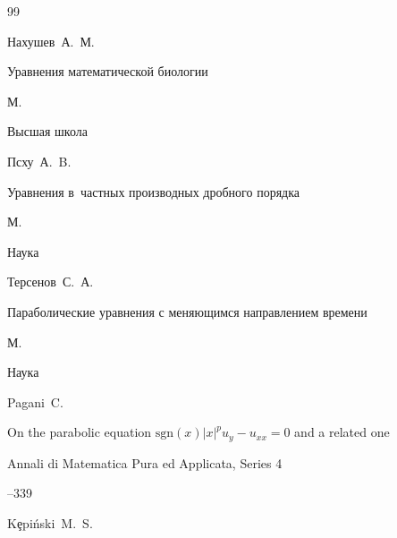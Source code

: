 \begin{thebibliography}{99}




\by  Нахушев~А.~М.

\book Уравнения математической биологии

\publaddr М.

\publ Высшая школа









\by Псху~А.~B.

\book Уравнения в~частных производных дробного порядка

\publaddr М.

\publ Наука







\by Терсенов~С.~А.

\book Параболические уравнения с меняющимся направлением времени

\publaddr М.

\publ Наука







\by Pagani~C.

\paper On the parabolic equation  $\text{sgn}(x)|x|^{p}u_y-u_{xx}=0$ and a related one

\jour Annali di Matematica Pura ed Applicata, Series 4 




--339





\by K\c{e}pi\'nski~M.~S.


\end{thebibliography}
